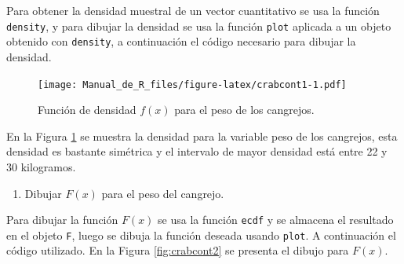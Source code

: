 \documentclass[10pt,]{krantz}
\makeatletter
\newenvironment{Shaded}{\begin{snugshade}}{\end{snugshade}}
\newcommand{\KeywordTok}[1]{\textcolor[rgb]{0.13,0.29,0.53}{\textbf{#1}}}
\newcommand{\DataTypeTok}[1]{\textcolor[rgb]{0.13,0.29,0.53}{#1}}
\newcommand{\DecValTok}[1]{\textcolor[rgb]{0.00,0.00,0.81}{#1}}
\newcommand{\FloatTok}[1]{\textcolor[rgb]{0.00,0.00,0.81}{#1}}
\newcommand{\StringTok}[1]{\textcolor[rgb]{0.31,0.60,0.02}{#1}}
\newcommand{\OperatorTok}[1]{\textcolor[rgb]{0.81,0.36,0.00}{\textbf{#1}}}
\newcommand{\NormalTok}[1]{#1}
\providecommand{\tightlist}{%
  \setlength{\itemsep}{0pt}\setlength{\parskip}{0pt}}
\newenvironment{kframe}{%
\medskip{}
\setlength{\fboxsep}{.8em}
 \def\at@end@of@kframe{}%
 \ifinner\ifhmode%
  \def\at@end@of@kframe{\end{minipage}}%
  \begin{minipage}{\columnwidth}%
 \fi\fi%
 \def\FrameCommand##1{\hskip\@totalleftmargin \hskip-\fboxsep
 \colorbox{shadecolor}{##1}\hskip-\fboxsep
     \hskip-\linewidth \hskip-\@totalleftmargin \hskip\columnwidth}%
 \MakeFramed {\advance\hsize-\width
   \@totalleftmargin\z@ \linewidth\hsize
   \@setminipage}}%
 {\par\unskip\endMakeFramed%
 \at@end@of@kframe}
\renewenvironment{Shaded}{\begin{kframe}}{\end{kframe}}
\makeatother
\begin{document}
Para obtener la densidad muestral de un vector cuantitativo se usa la
función \texttt{density}, y para dibujar la densidad se usa la función
\texttt{plot} aplicada a un objeto obtenido con \texttt{density}, a
continuación el código necesario para dibujar la densidad.

\begin{Shaded}
\end{Shaded}

\begin{figure}
\centering
\texttt{[image: Manual\_de\_R\_files/figure-latex/crabcont1-1.pdf]}
\caption{\label{fig:crabcont1}Función de densidad \(f(x)\) para el peso de
los cangrejos.}
\end{figure}

En la Figura \ref{fig:crabcont1} se muestra la densidad para la variable
peso de los cangrejos, esta densidad es bastante simétrica y el
intervalo de mayor densidad está entre 22 y 30 kilogramos.

\begin{enumerate}
\def\labelenumi{\arabic{enumi})}
\setcounter{enumi}{1}
\tightlist
\item
  Dibujar \(F(x)\) para el peso del cangrejo.
\end{enumerate}

Para dibujar la función \(F(x)\) se usa la función \texttt{ecdf} y se
almacena el resultado en el objeto \texttt{F}, luego se dibuja la
función deseada usando \texttt{plot}. A continuación el código
utilizado. En la Figura \ref{fig:crabcont2} se presenta el dibujo para
\(F(x)\).

\begin{Shaded}
\end{Shaded}
\end{document}
